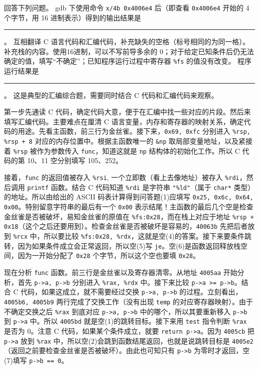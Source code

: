 \begin{problems}
        回答下列问题。
            \qn gdb 下使用命令 \verb|x/4b 0x4006e4| 后（即查看 \verb|0x4006e4| 开始的 4 个字节，用 16 进制表示）得到的输出结果是 \rule{2.5cm}{0.25mm}。
            \qn 互相翻译 C 语言代码和汇编代码，补充缺失的空格（标号相同的为同一格）。
            \qn 补充栈的内容。使用16进制，可以不写前导多余的 0；对于给定已知条件后仍无法确定的值，填写“不确定”；已知程序运行过程中寄存器 \verb|%fs| 的值没有改变。
            \qn 程序运行结果是 \rule{2.5cm}{0.25mm}。
        \sol 这是典型的汇编综合题，需要同时结合 C 代码和汇编代码来观察。
        
        第一步先通读 C 代码，确定代码大意，便于在汇编中找一些对应的片段。然后来填写汇编代码。主要难点在厘清 C 语言变量，内存和寄存器的映射关系，确定代码的用途。先看主函数，前三行为金丝雀。接下来，\verb|0x69, 0xfc| 分别进入 \verb|%rsp, %rsp + 8| 对应的内存位置中。根据主函数唯一的 \verb|&np| 取局部变量地址，以及紧接着 \verb|%rsp| 被作为参数传入 \verb|func|，知道这就是 \verb|np| 结构体的初始化工作。所以 C 代码的第 10、11 空分别填写 105、252。

        接着，\verb|func| 的返回值被存入 \verb|%rsi|, 一个立即数（看上去像地址）被存入 \verb|%rdi|，然后调用 \verb|printf| 函数。结合 C 代码知道 \verb|%rdi| 是字符串 \verb|"%ld"|（属于 \verb|char*| 类型）的地址。所以由给出的 ASCII 码表计算得到问答题(1)应填写 \verb|0x25, 0x6c, 0x64, 0x00|。特别留意字符串的最后有一个 \verb|0x00| 表示结尾！主函数的最后几个空是检查金丝雀是否被破坏，易知金丝雀的原值在 \verb|%fs:0x28|，而在栈上对应于地址 \verb|%rsp + 0x18|（这个之后还要用到）。检查金丝雀是否被破坏是容易的，\verb|40063b| 先把后者放到 \verb|%rcx| 中，所以要比较 \verb|%fs:0x28, %rdx|，这就是空(4)的答案。接下来要条件跳转，因为如果条件成立会正常返回，所以空(5)写 \verb|je|。空(6)是函数返回释放栈空间，因为一开始分配了 \verb|0x28| 个字节，所以这个空也要填 \verb|0x28|。

        现在分析 \verb|func| 函数。前三行是金丝雀以及寄存器清零。从地址 \verb|4005aa| 开始分析，首先 \verb|p->a, p->b| 分别进入 \verb|%rax, %rdx| 中。接下来比较 \verb|p->a >= p->b|。结合 C 代码，如果这成立，就不需要经过交换 \verb|p->a, p->b| 的过程。立刻看出，\verb|4005b6, 4005b9| 两行完成了交换工作（没有出现 \verb|temp| 的对应寄存器映射）。由于不确定交换之后 \verb|%rax| 到底对应 \verb|p->a, p->b| 中的哪个，所以其要重新移入 \verb|p->b| 到 \verb|p->a| 中。所以 \verb|4005bd| 就是空(1)的跳转目标。接下来用 \verb|test| 指令判断 \verb|%rax| 是否为 0。注意 C 代码，如果某个条件成立，就要 \verb|return p->a|。因为 \verb|4005cb| 把 \verb|p->a| 放到 \verb|%rax| 中，所以空(2)会跳到函数结尾返回，也就是说跳转目标是 \verb|4005e2|（返回之前要检查金丝雀是否被破坏）。由此也可知只有 \verb|p->b| 为零时才返回，空(7)填写 \verb|p->b == 0|。


\end{problems}
